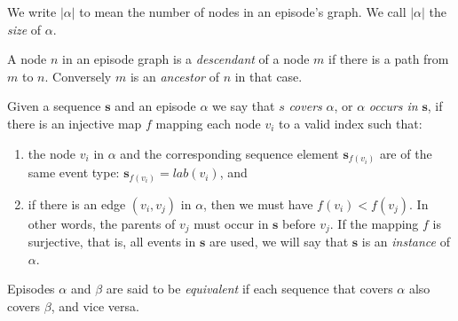 We write $ | \alpha | $ to mean the number of nodes in an episode's graph. We call $ | \alpha | $ the \emph{size} of $ \alpha $.

\begin{definition}
A node $ n $ in an episode graph is a \emph{descendant} of a node $ m $ if there is a path from $ m $ to $ n $. Conversely $ m $ is an \emph{ancestor} of $ n $ in that case.
\end{definition}

\begin{definition}
Given a sequence $ \boldsymbol{s} $ and an episode $ \alpha $ we say that $ s $ \emph{covers} $ \alpha $, or $ \alpha $ \emph{occurs in} $ \boldsymbol{s} $, if there is an injective map $ f $ mapping each node $ v_i $ to a valid index such that:
\begin{enumerate}
\item the node $ v_i $ in $ \alpha $ and the corresponding sequence element $ \boldsymbol{s}_{f(v_i)} $ are of the same event type: $ \boldsymbol{s}_{f(v_i)} = lab(v_i) $, and
\item if there is an edge $ (v_i, v_j) $ in $ \alpha $, then we must have $ f(v_i) < f(v_j) $. In other words, the parents of $ v_j $ must occur in $ \boldsymbol{s} $ before $ v_j $. If the mapping $ f $ is surjective, that is, all events in $ \boldsymbol{s} $ are used, we will say that $ \boldsymbol{s} $ is an \emph{instance} of $ \alpha $.
\end{enumerate}
\end{definition}

\begin{definition}
Episodes $ \alpha $ and $ \beta $ are said to be \emph{equivalent} if each sequence that covers $ \alpha $ also covers $ \beta $, and vice versa.
\end{definition}

